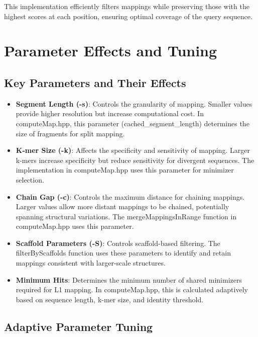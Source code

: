 \documentclass{article}
\begin{document}
This implementation efficiently filters mappings while preserving those with the highest scores at each position, ensuring optimal coverage of the query sequence.

\section{Parameter Effects and Tuning}

\subsection{Key Parameters and Their Effects}

\begin{itemize}
    \item \textbf{Segment Length (-s)}: Controls the granularity of mapping. Smaller values provide higher resolution but increase computational cost. In computeMap.hpp, this parameter (cached\_segment\_length) determines the size of fragments for split mapping.
    
    \item \textbf{K-mer Size (-k)}: Affects the specificity and sensitivity of mapping. Larger k-mers increase specificity but reduce sensitivity for divergent sequences. The implementation in computeMap.hpp uses this parameter for minimizer selection.
    
    \item \textbf{Chain Gap (-c)}: Controls the maximum distance for chaining mappings. Larger values allow more distant mappings to be chained, potentially spanning structural variations. The mergeMappingsInRange function in computeMap.hpp uses this parameter.
    
    \item \textbf{Scaffold Parameters (-S)}: Controls scaffold-based filtering. The filterByScaffolds function uses these parameters to identify and retain mappings consistent with larger-scale structures.
    
    \item \textbf{Minimum Hits}: Determines the minimum number of shared minimizers required for L1 mapping. In computeMap.hpp, this is calculated adaptively based on sequence length, k-mer size, and identity threshold.
\end{itemize}

\subsection{Adaptive Parameter Tuning}
\end{document}
